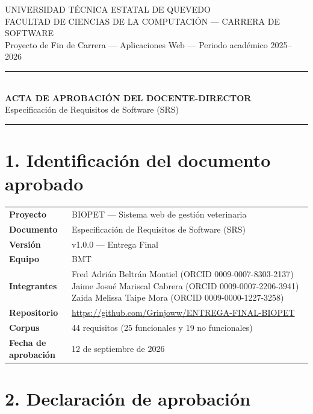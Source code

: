 \documentclass[11pt,letterpaper]{article}
\begin{document}
\begin{center}
	{\footnotesize UNIVERSIDAD TÉCNICA ESTATAL DE QUEVEDO\\[1pt]
	FACULTAD DE CIENCIAS DE LA COMPUTACIÓN --- CARRERA DE SOFTWARE\\[1pt]
	Proyecto de Fin de Carrera --- Aplicaciones Web --- Periodo académico 2025--2026}\\[10pt]
	\rule{\textwidth}{0.8pt}\\[8pt]
	{\large\bfseries ACTA DE APROBACIÓN DEL DOCENTE-DIRECTOR}\\[3pt]
	{\normalsize Especificación de Requisitos de Software (SRS)}\\[6pt]
	\rule{\textwidth}{0.8pt}
\end{center}

\vspace{0pt}

\section*{1. Identificación del documento aprobado}

\renewcommand{\arraystretch}{1.08}
\noindent\begin{tabular}{@{}>{\bfseries}p{4.6cm}p{10.4cm}@{}}
	\toprule
	Proyecto & BIOPET --- Sistema web de gestión veterinaria \\
	Documento & Especificación de Requisitos de Software (SRS) \\
	Versión & v1.0.0 --- Entrega Final \\
	Equipo & BMT \\
	Integrantes & Fred Adrián Beltrán Montiel (ORCID 0009-0007-8303-2137) \newline Jaime Josué Mariscal Cabrera (ORCID 0009-0007-2206-3941) \newline Zaida Melissa Taipe Mora (ORCID 0009-0000-1227-3258) \\
	Repositorio & \url{https://github.com/Grinjoww/ENTREGA-FINAL-BIOPET} \\
	Corpus & 44 requisitos (25 funcionales y 19 no funcionales) \\
	Fecha de aprobación & 12 de septiembre de 2026 \\
	\bottomrule
\end{tabular}

\section*{2. Declaración de aprobación}
\end{document}
